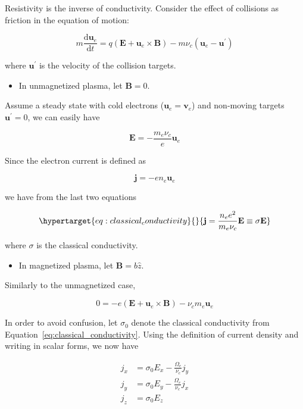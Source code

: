 \documentclass[
  notoc %
]{tufte-book}
\providecommand{\tightlist}{%
  \setlength{\itemsep}{0pt}\setlength{\parskip}{0pt}
}
\begin{document}
Resistivity is the inverse of conductivity. Consider the effect of
collisions as friction in the equation of motion:

\[
m\frac{\mathrm{d}\mathbf{u}_e}{\mathrm{d}t} = q(\mathbf{E}+\mathbf{u}_e\times\mathbf{B}) - m\nu_c(\mathbf{u}_e - \mathbf{u}^\prime)
\]

where \(\mathbf{u}^\prime\) is the velocity of the collision targets.

\begin{itemize}
\tightlist
\item
  In unmagnetized plasma, let \(\mathbf{B}=0\).
\end{itemize}

Assume a steady state with cold electrons
(\(\mathbf{u}_e = \mathbf{v}_e\)) and non-moving targets
\(\mathbf{u}^\prime = 0\), we can easily have

\[
\mathbf{E} = -\frac{m_e\nu_c}{e}\mathbf{u}_e
\]

Since the electron current is defined as

\[
\mathbf{j} = -en_e\mathbf{u}_e
\]

we have from the last two equations

\begin{equation}\protect\hypertarget{eq:classical_conductivity}{}{
\mathbf{j} = \frac{n_e e^2}{m_e\nu_c}\mathbf{E} \equiv \sigma\mathbf{E}
}\label{eq:classical_conductivity}\end{equation}

where \(\sigma\) is the classical conductivity.

\begin{itemize}
\tightlist
\item
  In magnetized plasma, let \(\mathbf{B}=b\hat{z}\).
\end{itemize}

Similarly to the unmagnetized case,

\[
0 = -e(\mathbf{E} + \mathbf{u}_e\times\mathbf{B}) - \nu_c m_e\mathbf{u}_e
\]

In order to avoid confusion, let \(\sigma_0\) denote the classical
conductivity from Equation~\ref{eq:classical_conductivity}. Using the
definition of current density and writing in scalar forms, we now have

\[
\begin{aligned}
j_x &= \sigma_0 E_x - \frac{\Omega_e}{\nu_c}j_y \\
j_y &= \sigma_0 E_y - \frac{\Omega_e}{\nu_c}j_x \\
j_z &= \sigma_0 E_z
\end{aligned}
\]
\end{document}
